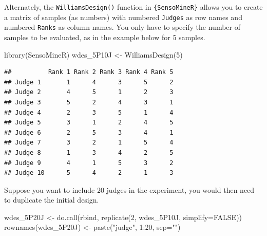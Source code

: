 \documentclass[
]{krantz}
\makeatletter
\newenvironment{Shaded}{\begin{snugshade}}{\end{snugshade}}
\newcommand{\AttributeTok}[1]{\textcolor[rgb]{0.61,0.61,0.61}{#1}}
\newcommand{\ConstantTok}[1]{\textcolor[rgb]{0,0,0}{#1}}
\newcommand{\DecValTok}[1]{\textcolor[rgb]{0.06,0.06,0.06}{#1}}
\newcommand{\FunctionTok}[1]{\textcolor[rgb]{0,0,0}{#1}}
\newcommand{\NormalTok}[1]{#1}
\newcommand{\OtherTok}[1]{\textcolor[rgb]{0.37,0.37,0.37}{#1}}
\newcommand{\SpecialCharTok}[1]{\textcolor[rgb]{0,0,0}{#1}}
\newcommand{\StringTok}[1]{\textcolor[rgb]{0.5,0.5,0.5}{#1}}
\newenvironment{kframe}{%
\medskip{}
\setlength{\fboxsep}{.8em}
 \def\at@end@of@kframe{}%
 \ifinner\ifhmode%
  \def\at@end@of@kframe{\end{minipage}}%
  \begin{minipage}{\columnwidth}%
 \fi\fi%
 \def\FrameCommand##1{\hskip\@totalleftmargin \hskip-\fboxsep
 \colorbox{shadecolor}{##1}\hskip-\fboxsep
     \hskip-\linewidth \hskip-\@totalleftmargin \hskip\columnwidth}%
 \MakeFramed {\advance\hsize-\width
   \@totalleftmargin\z@ \linewidth\hsize
   \@setminipage}}%
 {\par\unskip\endMakeFramed%
 \at@end@of@kframe}
\renewenvironment{Shaded}{\begin{kframe}}{\end{kframe}}
\makeatother
\begin{document}
Alternately, the \texttt{WilliamsDesign()} function in \texttt{\{SensoMineR\}} allows you to create a matrix of samples (as numbers) with numbered \texttt{Judges} as row names and numbered \texttt{Ranks} as column names. You only have to specify the number of samples to be evaluated, as in the example below for 5 samples.

\begin{Shaded}
\begin{Highlighting}[]
\FunctionTok{library}\NormalTok{(SensoMineR)}
\NormalTok{wdes\_5P10J }\OtherTok{\textless{}{-}} \FunctionTok{WilliamsDesign}\NormalTok{(}\DecValTok{5}\NormalTok{)}
\end{Highlighting}
\end{Shaded}

\begin{verbatim}
##          Rank 1 Rank 2 Rank 3 Rank 4 Rank 5
## Judge 1       1      4      3      5      2
## Judge 2       4      5      1      2      3
## Judge 3       5      2      4      3      1
## Judge 4       2      3      5      1      4
## Judge 5       3      1      2      4      5
## Judge 6       2      5      3      4      1
## Judge 7       3      2      1      5      4
## Judge 8       1      3      4      2      5
## Judge 9       4      1      5      3      2
## Judge 10      5      4      2      1      3
\end{verbatim}

Suppose you want to include 20 judges in the experiment, you would then need to duplicate the initial design.

\begin{Shaded}
\begin{Highlighting}[]
\NormalTok{wdes\_5P20J }\OtherTok{\textless{}{-}} \FunctionTok{do.call}\NormalTok{(rbind, }\FunctionTok{replicate}\NormalTok{(}\DecValTok{2}\NormalTok{, wdes\_5P10J, }\AttributeTok{simplify=}\ConstantTok{FALSE}\NormalTok{))}
\FunctionTok{rownames}\NormalTok{(wdes\_5P20J) }\OtherTok{\textless{}{-}} \FunctionTok{paste}\NormalTok{(}\StringTok{"judge"}\NormalTok{, }\DecValTok{1}\SpecialCharTok{:}\DecValTok{20}\NormalTok{, }\AttributeTok{sep=}\StringTok{""}\NormalTok{)}
\end{Highlighting}
\end{Shaded}
\end{document}
